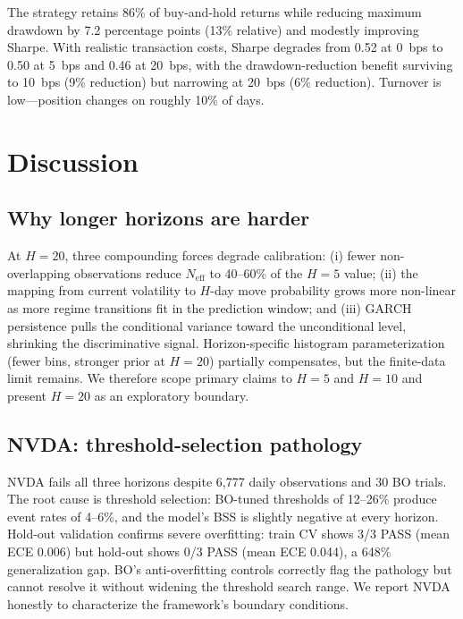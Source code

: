 \documentclass[11pt,a4paper]{article}
\newcommand{\Neff}{N_{\text{eff}}}
\begin{document}
The strategy retains 86\% of buy-and-hold returns while reducing maximum drawdown by 7.2 percentage points (13\% relative) and modestly improving Sharpe. With realistic transaction costs, Sharpe degrades from 0.52 at 0~bps to 0.50 at 5~bps and 0.46 at 20~bps, with the drawdown-reduction benefit surviving to 10~bps (9\% reduction) but narrowing at 20~bps (6\% reduction). Turnover is low---position changes on roughly 10\% of days.

\section{Discussion}
\label{sec:discussion}

\subsection{Why longer horizons are harder}
\label{sec:horizon}

At $H\!=\!20$, three compounding forces degrade calibration:
(i) fewer non-overlapping observations reduce $\Neff$ to 40--60\% of the $H\!=\!5$ value;
(ii) the mapping from current volatility to $H$-day move probability grows more non-linear as more regime transitions fit in the prediction window; and
(iii) GARCH persistence pulls the conditional variance toward the unconditional level, shrinking the discriminative signal.
Horizon-specific histogram parameterization (fewer bins, stronger prior at $H\!=\!20$) partially compensates, but the finite-data limit remains. We therefore scope primary claims to $H\!=\!5$ and $H\!=\!10$ and present $H\!=\!20$ as an exploratory boundary.

\subsection{NVDA: threshold-selection pathology}
\label{sec:nvda}

NVDA fails all three horizons despite 6,777 daily observations and 30 BO trials. The root cause is threshold selection: BO-tuned thresholds of 12--26\% produce event rates of 4--6\%, and the model's BSS is slightly negative at every horizon. Hold-out validation confirms severe overfitting: train CV shows 3/3 PASS (mean ECE 0.006) but hold-out shows 0/3 PASS (mean ECE 0.044), a 648\% generalization gap. BO's anti-overfitting controls correctly flag the pathology but cannot resolve it without widening the threshold search range. We report NVDA honestly to characterize the framework's boundary conditions.
\end{document}
